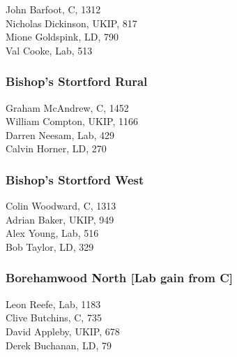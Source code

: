 \documentclass[a4paper,openany,10pt]{book}
\begin{document}


John Barfoot, C, 1312\\
Nicholas Dickinson, UKIP, 817\\
Mione Goldspink, LD, 790\\
Val Cooke, Lab, 513\\


\subsubsection*{Bishop's Stortford Rural}



Graham McAndrew, C, 1452\\
William Compton, UKIP, 1166\\
Darren Neesam, Lab, 429\\
Calvin Horner, LD, 270\\


\subsubsection*{Bishop's Stortford West}



Colin Woodward, C, 1313\\
Adrian Baker, UKIP, 949\\
Alex Young, Lab, 516\\
Bob Taylor, LD, 329\\


\subsubsection*{Borehamwood North \hspace*{\fill}\nolinebreak[1]%
\enspace\hspace*{\fill}
[Lab gain from C]}



Leon Reefe, Lab, 1183\\
Clive Butchins, C, 735\\
David Appleby, UKIP, 678\\
Derek Buchanan, LD, 79\\
\end{document}
